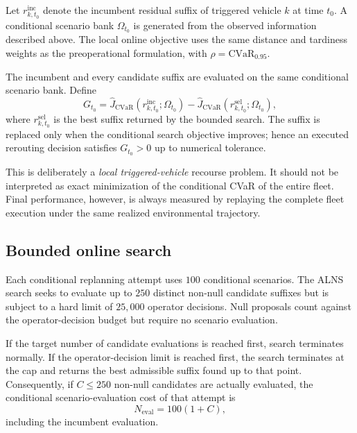 \documentclass[preprint,12pt]{elsarticle}
\newcommand{\CVaR}{\mathrm{CVaR}}
\newcommand{\1}{\mathbf{1}}
\begin{document}
Let $r^{\mathrm{inc}}_{k,t_0}$ denote the incumbent residual suffix of triggered
vehicle $k$ at time $t_0$. A conditional scenario bank
$\Omega_{t_0}$ is generated from the observed information described above.
The local online objective uses the same distance and tardiness weights as the
preoperational formulation, with $\rho=\CVaR_{0.95}$.

The incumbent and every candidate suffix are evaluated on the same conditional
scenario bank. Define
\begin{equation}
	G_{t_0}
	=
	\widehat{J}_{\CVaR}
	\left(
	r^{\mathrm{inc}}_{k,t_0};
	\Omega_{t_0}
	\right)
	-
	\widehat{J}_{\CVaR}
	\left(
	r^{\mathrm{sel}}_{k,t_0};
	\Omega_{t_0}
	\right),
	\label{eq:conditional_search_gain}
\end{equation}
where $r^{\mathrm{sel}}_{k,t_0}$ is the best suffix returned by the bounded
search. The suffix is replaced only when the conditional search objective
improves; hence an executed rerouting decision satisfies $G_{t_0}>0$ up to
numerical tolerance.

This is deliberately a \emph{local triggered-vehicle} recourse problem.
It should not be interpreted as exact minimization of the conditional CVaR of
the entire fleet. Final performance, however, is always measured by replaying
the complete fleet execution under the same realized environmental trajectory.

\subsection{Bounded online search}
\label{subsec:bounded_search}

Each conditional replanning attempt uses $100$ conditional scenarios.
The ALNS search seeks to evaluate up to $250$ distinct non-null candidate
suffixes but is subject to a hard limit of $25{,}000$ operator decisions.
Null proposals count against the operator-decision budget but require no
scenario evaluation.

If the target number of candidate evaluations is reached first, search terminates
normally. If the operator-decision limit is reached first, the search terminates
at the cap and returns the best admissible suffix found up to that point.
Consequently, if $C\le250$ non-null candidates are actually evaluated, the
conditional scenario-evaluation cost of that attempt is
\begin{equation}
	N_{\mathrm{eval}}
	=
	100(1+C),
	\label{eq:conditional_budget}
\end{equation}
including the incumbent evaluation.
\end{document}
